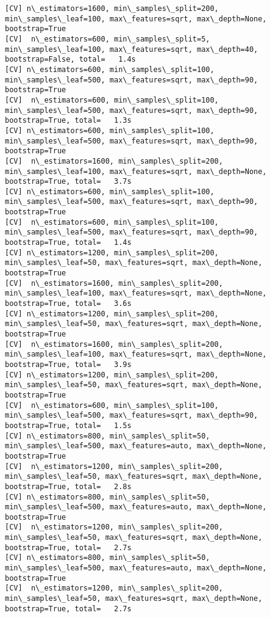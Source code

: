 \documentclass[11pt]{article}
\begin{document}
\begin{Verbatim}[commandchars=\\\{\}]
[CV] n\_estimators=1600, min\_samples\_split=200, min\_samples\_leaf=100, max\_features=sqrt, max\_depth=None, bootstrap=True 
[CV]  n\_estimators=600, min\_samples\_split=5, min\_samples\_leaf=100, max\_features=sqrt, max\_depth=40, bootstrap=False, total=   1.4s
[CV] n\_estimators=600, min\_samples\_split=100, min\_samples\_leaf=500, max\_features=sqrt, max\_depth=90, bootstrap=True 
[CV]  n\_estimators=600, min\_samples\_split=100, min\_samples\_leaf=500, max\_features=sqrt, max\_depth=90, bootstrap=True, total=   1.3s
[CV] n\_estimators=600, min\_samples\_split=100, min\_samples\_leaf=500, max\_features=sqrt, max\_depth=90, bootstrap=True 
[CV]  n\_estimators=1600, min\_samples\_split=200, min\_samples\_leaf=100, max\_features=sqrt, max\_depth=None, bootstrap=True, total=   3.7s
[CV] n\_estimators=600, min\_samples\_split=100, min\_samples\_leaf=500, max\_features=sqrt, max\_depth=90, bootstrap=True 
[CV]  n\_estimators=600, min\_samples\_split=100, min\_samples\_leaf=500, max\_features=sqrt, max\_depth=90, bootstrap=True, total=   1.4s
[CV] n\_estimators=1200, min\_samples\_split=200, min\_samples\_leaf=50, max\_features=sqrt, max\_depth=None, bootstrap=True 
[CV]  n\_estimators=1600, min\_samples\_split=200, min\_samples\_leaf=100, max\_features=sqrt, max\_depth=None, bootstrap=True, total=   3.6s
[CV] n\_estimators=1200, min\_samples\_split=200, min\_samples\_leaf=50, max\_features=sqrt, max\_depth=None, bootstrap=True 
[CV]  n\_estimators=1600, min\_samples\_split=200, min\_samples\_leaf=100, max\_features=sqrt, max\_depth=None, bootstrap=True, total=   3.9s
[CV] n\_estimators=1200, min\_samples\_split=200, min\_samples\_leaf=50, max\_features=sqrt, max\_depth=None, bootstrap=True 
[CV]  n\_estimators=600, min\_samples\_split=100, min\_samples\_leaf=500, max\_features=sqrt, max\_depth=90, bootstrap=True, total=   1.5s
[CV] n\_estimators=800, min\_samples\_split=50, min\_samples\_leaf=500, max\_features=auto, max\_depth=None, bootstrap=True 
[CV]  n\_estimators=1200, min\_samples\_split=200, min\_samples\_leaf=50, max\_features=sqrt, max\_depth=None, bootstrap=True, total=   2.8s
[CV] n\_estimators=800, min\_samples\_split=50, min\_samples\_leaf=500, max\_features=auto, max\_depth=None, bootstrap=True 
[CV]  n\_estimators=1200, min\_samples\_split=200, min\_samples\_leaf=50, max\_features=sqrt, max\_depth=None, bootstrap=True, total=   2.7s
[CV] n\_estimators=800, min\_samples\_split=50, min\_samples\_leaf=500, max\_features=auto, max\_depth=None, bootstrap=True 
[CV]  n\_estimators=1200, min\_samples\_split=200, min\_samples\_leaf=50, max\_features=sqrt, max\_depth=None, bootstrap=True, total=   2.7s

\end{Verbatim}
\end{document}

